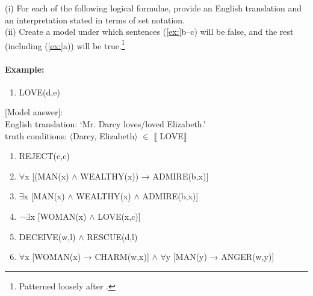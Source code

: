\begin{stylepoints}
(i) For each of the following logical formulae, provide an English translation and an interpretation stated in terms of set notation.\\
(ii) Create a model under which sentences (\ref{ex:}b--c) will be false, and the rest (including (\ref{ex:}a)) will be true.\footnote{Patterned loosely after \citet[350]{Saeed2009}.}
\end{stylepoints}

\paragraph{Example:}

\begin{enumerate}
\item LOVE(d,e)
\end{enumerate}

\textsf{[Model answer]:\\
English translation: ‘Mr. Darcy loves/loved Elizabeth.’\\
truth conditions:} $\langle$\textsf{Darcy, Elizabeth}$\rangle$\textsf{} ${\in}$\textsf{} $\llbracket$ \textsf{LOVE}$\rrbracket$ 

\begin{enumerate}
\item REJECT(e,c)
\item ${\forall}$x [(MAN(x) $\wedge$ WEALTHY(x)) → ADMIRE(b,x)]
\item ${\exists}$x [MAN(x) $\wedge$ WEALTHY(x) $\wedge$ ADMIRE(b,x)]
\item ¬${\exists}$x [WOMAN(x) $\wedge$ LOVE(x,c)]
\item DECEIVE(w,l) $\wedge$ RESCUE(d,l)
\item ${\forall}$x [WOMAN(x) → CHARM(w,x)] $\wedge$ ${\forall}$y [MAN(y) → ANGER(w,y)]
\end{enumerate}

